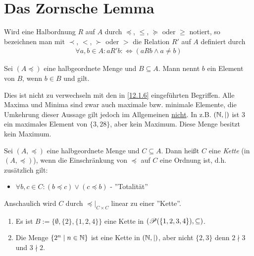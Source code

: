 \documentclass[../../main.tex]{subfiles}
\begin{document}
\section{Das Zornsche Lemma}

\begin{nt}\label{12.2.1} 
Wird eine Halbordnung $R$ auf $A$ durch $\preceq$, $\le$, $\succeq$ oder $\ge$ notiert, so bezeichnen man mit $\prec$, $<$, $\succ$ oder $>$ die Relation $R'$ auf $A$ definiert durch
\begin{align*}
				\forall a,b\in A: aR'b:\Longleftrightarrow (aRb\land a\neq b)
\end{align*}
\end{nt}	

\begin{df}\label{12.2.2} 
Sei $(A\preceq)$ eine halbgeordnete Menge und $B\subseteq A$. Mann nennt $b$ ein   Element von $B$, wenn $b\in B$ und  gilt.
\end{df}

\begin{bem}\label{12.2.3} 
Dies ist nicht zu verwechseln mit den in \ref{12.1.6} eingeführten Begriffen. Alle Maxima und Minima sind zwar auch maximale bzw. minimale Elemente, die Umkehrung dieser Aussage gilt jedoch im Allgemeinen \underline{nicht}. In z.B. $(\mathbb N,\mid)$ ist $3$ ein maximales Element von $\{3,28\}$, aber kein Maximum. Diese Menge besitzt kein Maximum.
\end{bem}
		
\begin{df}\label{12.2.4}
Sei $(A,\preceq)$ eine halbgeordnete Menge und $C\subseteq A$. Dann heißt $C$ eine \emph{Kette} (in $(A,\preceq)$), wenn die Einschränkung von $\preceq$ auf $C$ eine Ordnung ist, d.h. zusätzlich gilt:
\begin{itemize}
	\item $\forall b,c\in C: (b\preceq c)\lor(c\preceq b)$ - ''Totalität''
\end{itemize}
Anschaulich wird $C$ durch $\preceq\vert_{C\times C}$ linear zu einer ''Kette''.
\end{df}
		
\begin{bsp}\label{12.2.5}
\begin{enumerate}[\normalfont(a)]
\item Es ist $B:=\{\emptyset,\{2\},\{1,2,4\}\}$ eine Kette in $(\mathcal P(\{1,2,3,4\}),\subseteq)$.
\item Die Menge $\{2^n\mid n\in\mathbb N\}$ ist eine Kette in $(\mathbb N,\mid)$, aber nicht $\{2,3\}$ denn $2\nmid 3$ und $3\nmid 2$.
\end{enumerate}
\end{bsp}
\end{document}
